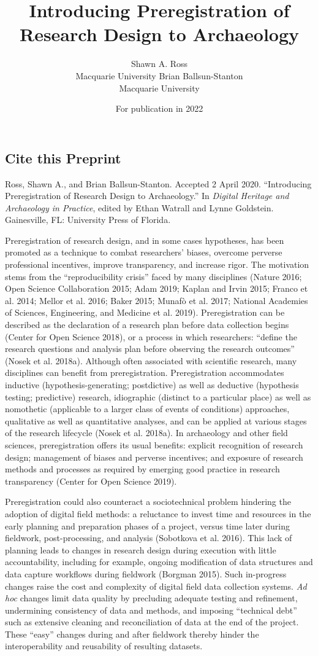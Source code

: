 \documentclass[article]{sa}
\title{Introducing Preregistration of Research Design to Archaeology}
\author{Shawn A. Ross\\Macquarie University \And Brian Ballsun-Stanton\\Macquarie University}
\date{For publication in 2022}
\begin{document}
\subsection*{Cite this Preprint}

{\small
\hangindent=0.5cm{}Ross, Shawn A., and Brian Ballsun-Stanton. Accepted 2 April 2020. ``Introducing Preregistration of Research Design to Archaeology.'' In \textit{Digital Heritage and Archaeology in Practice}, edited by Ethan Watrall and Lynne Goldstein. Gainesville, FL: University Press of Florida.

 }


\newpage

Preregistration of research design, and in some cases hypotheses, has
been promoted as a technique to combat researchers' biases, overcome
perverse professional incentives, improve transparency, and increase
rigor. The motivation stems from the ``reproducibility crisis'' faced by
many disciplines (Nature 2016; Open Science Collaboration 2015; Adam
2019; Kaplan and Irvin 2015; Franco et al. 2014; Mellor et al. 2016;
Baker 2015; Munafò et al. 2017; National Academies of Sciences,
Engineering, and Medicine et al. 2019). Preregistration can be described
as the declaration of a research plan before data collection begins
(Center for Open Science 2018), or a process in which researchers:
``define the research questions and analysis plan before observing the
research outcomes'' (Nosek et al. 2018a). Although often associated with
scientific research, many disciplines can benefit from preregistration.
Preregistration accommodates inductive (hypothesis-generating;
postdictive) as well as deductive (hypothesis testing; predictive)
research, idiographic (distinct to a particular place) as well as
nomothetic (applicable to a larger class of events of conditions)
approaches, qualitative as well as quantitative analyses, and can be
applied at various stages of the research lifecycle (Nosek et al.
2018a). In archaeology and other field sciences, preregistration offers
its usual benefits: explicit recognition of research design; management
of biases and perverse incentives; and exposure of research methods and
processes as required by emerging good practice in research transparency
(Center for Open Science 2019).

Preregistration could also counteract a sociotechnical problem hindering
the adoption of digital field methods: a reluctance to invest time and
resources in the early planning and preparation phases of a project,
versus time later during fieldwork, post-processing, and analysis
(Sobotkova et al. 2016). This lack of planning leads to changes in
research design during execution with little accountability, including
for example, ongoing modification of data structures and data capture
workflows during fieldwork (Borgman 2015). Such in-progress changes
raise the cost and complexity of digital field data collection systems.
\emph{Ad hoc} changes limit data quality by precluding adequate testing
and refinement, undermining consistency of data and methods, and
imposing ``technical debt'' such as extensive cleaning and reconciliation
of data at the end of the project. These ``easy'' changes during and after
fieldwork thereby hinder the interoperability and reusability of
resulting datasets.
\end{document}
